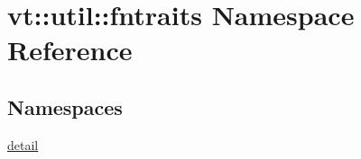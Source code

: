 \hypertarget{namespacevt_1_1util_1_1fntraits}{}\section{vt\+:\+:util\+:\+:fntraits Namespace Reference}
\label{namespacevt_1_1util_1_1fntraits}
\subsection*{Namespaces}
\begin{DoxyCompactItemize}
\item 
 \hyperlink{namespacevt_1_1util_1_1fntraits_1_1detail}{detail}
\end{DoxyCompactItemize}
